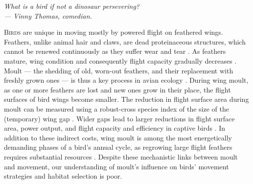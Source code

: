 


\begin{center}
    \emph{What is a bird if not a dinosaur persevering?\\
    --- Vinny Thomas, comedian.}
\end{center}

\medskip

\lettrine{B}{irds} are unique in moving mostly by powered flight on feathered wings.
Feathers, unlike animal hair and claws, are dead proteinaceous structures, which cannot be renewed continuously as they suffer wear and tear \parencite{rayner1988,jenni1989}.
As feathers mature, wing condition and consequently flight capacity gradually decreases \parencite{lindstrom1994,hedenstrom1999,hedenstrom2003}.
Moult --- the shedding of old, worn-out feathers, and their replacement with freshly grown ones --- is thus a key process in avian ecology \parencite{ginn1983,rayner1988}.
During wing moult, as one or more feathers are lost and new ones grow in their place, the flight surfaces of bird wings become smaller.
The reduction in flight surface area during moult can be measured using a robust-cross species index of the size of the (temporary) wing gap \citep{lind2001,kiat2016}.
Wider gaps lead to larger reductions in flight surface area, power output, and flight capacity and efficiency in captive birds \parencite{tucker1991,swaddle1996,swaddle1997,williams2003,lind2001,lind2001a,bowlin2009}.
In addition to these indirect costs, wing moult is among the most energetically demanding phases of a bird's annual cycle, as regrowing large flight feathers requires substantial resources \parencite{lindstrom1993,newton2009,kiat2017}.
Despite these mechanistic links between moult and movement, our understanding of moult's influence on birds' movement strategies and habitat selection is poor.


